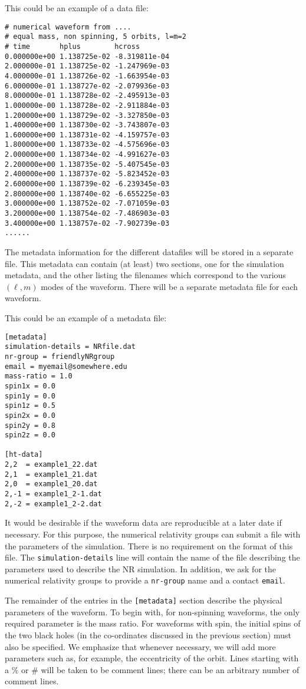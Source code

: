 \documentclass[prd,preprintnumbers,superscriptaddress,eqsecnum]{revtex4}
\numberwithin{equation}{section}
\begin{document}
{This could be an example of a data file:

\begin{verbatim}
# numerical waveform from ....
# equal mass, non spinning, 5 orbits, l=m=2
# time       hplus        hcross
0.000000e+00 1.138725e-02 -8.319811e-04
2.000000e-01 1.138725e-02 -1.247969e-03
4.000000e-01 1.138726e-02 -1.663954e-03
6.000000e-01 1.138727e-02 -2.079936e-03
8.000000e-01 1.138728e-02 -2.495913e-03
1.000000e-00 1.138728e-02 -2.911884e-03
1.200000e+00 1.138729e-02 -3.327850e-03
1.400000e+00 1.138730e-02 -3.743807e-03
1.600000e+00 1.138731e-02 -4.159757e-03
1.800000e+00 1.138733e-02 -4.575696e-03
2.000000e+00 1.138734e-02 -4.991627e-03
2.200000e+00 1.138735e-02 -5.407545e-03
2.400000e+00 1.138737e-02 -5.823452e-03
2.600000e+00 1.138739e-02 -6.239345e-03
2.800000e+00 1.138740e-02 -6.655225e-03
3.000000e+00 1.138752e-02 -7.071059e-03
3.200000e+00 1.138754e-02 -7.486903e-03
3.400000e+00 1.138757e-02 -7.902739e-03
......
\end{verbatim}

The metadata information for the different datafiles will be stored in a
separate file.  This metadata can contain (at least) two sections,
one for the simulation metadata, and the other listing the filenames
which correspond to the various $(\ell,m)$ modes of the waveform.  There
will be a separate metadata file for each waveform.

This could be an example of a metadata file:

\begin{verbatim}
[metadata]
simulation-details = NRfile.dat
nr-group = friendlyNRgroup
email = myemail@somewhere.edu
mass-ratio = 1.0
spin1x = 0.0
spin1y = 0.0
spin1z = 0.5
spin2x = 0.0
spin2y = 0.8
spin2z = 0.0

[ht-data]
2,2  = example1_22.dat
2,1  = example1_21.dat
2,0  = example1_20.dat
2,-1 = example1_2-1.dat
2,-2 = example1_2-2.dat
\end{verbatim}

It would be desirable if the waveform data are reproducible at a later
date if necessary.  For this purpose, the numerical relativity groups
can submit a file with the parameters of the simulation.  There is no
requirement on the format of this file.  The
\texttt{simulation-details} line will contain the name of the file
describing the parameters used to describe the NR simulation.  In
addition, we ask for the numerical relativity groups to provide a
\texttt{nr-group} name and a contact \texttt{email}.

The remainder of the entries in the \texttt{[metadata]} section
describe the physical parameters of the waveform.  To begin with, for
non-spinning waveforms, the only required parameter is the mass ratio.
For waveforms with spin, the initial spins of the two black holes (in
the co-ordinates discussed in the previous section) must also be
specified. We emphasize that whenever necessary, we will add more
parameters such as, for example, the eccentricity of the orbit. Lines
starting with a $\%$ or $\#$ will be taken to be comment lines; there
can be an arbitrary number of comment lines.

}
\end{document}
